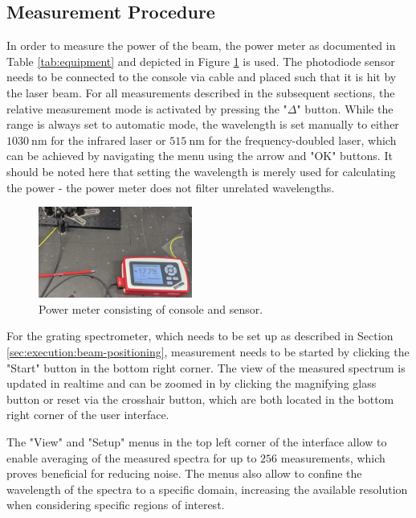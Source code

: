 \subsection{Measurement Procedure}
\label{sec:execution:measurement-procedure}

In order to measure the power of the beam, the power meter as documented in Table \ref{tab:equipment} and depicted in Figure \ref{fig:execution:powermeter} is used. The photodiode sensor needs to be connected to the console via cable and placed such that it is hit by the laser beam. For all measurements described in the subsequent sections, the relative measurement mode is activated by pressing the "$\Delta$" button. While the range is always set to automatic mode, the wavelength is set manually to either $\SI{1030}{\nm}$ for the infrared laser or $\SI{515}{\nm}$ for the frequency-doubled laser, which can be achieved by navigating the menu using the arrow and "OK" buttons. It should be noted here that setting the wavelength is merely used for calculating the power - the power meter does not filter unrelated wavelengths.

\begin{figure}[H]
    \centering
    \includegraphics[width=0.45\textwidth]{graphics/power-meter.png}
    \caption{Power meter consisting of console and sensor.}
    \label{fig:execution:powermeter}
\end{figure}

For the grating spectrometer, which needs to be set up as described in Section \ref{sec:execution:beam-positioning}, measurement needs to be started by clicking the "Start" button in the bottom right corner. The view of the measured spectrum is updated in realtime and can be zoomed in by clicking the magnifying glass button or reset via the crosshair button, which are both located in the bottom right corner of the user interface.

The "View" and "Setup" menus in the top left corner of the interface allow to enable averaging of the measured spectra for up to $256$ measurements, which proves beneficial for reducing noise. The menus also allow to confine the wavelength of the spectra to a specific domain, increasing the available resolution when considering specific regions of interest.

